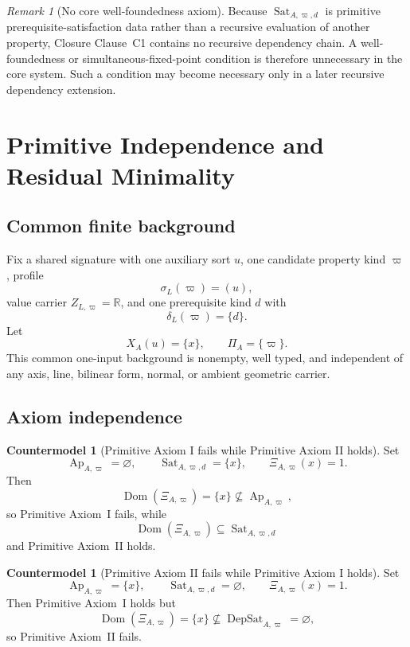 \documentclass[11pt]{article}
\newcommand{\Ap}{\operatorname{Ap}}
\newcommand{\DepSat}{\operatorname{DepSat}}
\newcommand{\Sat}{\operatorname{Sat}}
\newcommand{\Dom}{\operatorname{Dom}}
\theoremstyle{definition}
\newtheorem{countermodel}[theorem]{Countermodel}
\theoremstyle{remark}
\newtheorem{remark}[theorem]{Remark}
\begin{document}
\begin{remark}[No core well-foundedness axiom]
Because \(\Sat_{A,\varpi,d}\) is primitive prerequisite-satisfaction data rather than a recursive evaluation of another property, Closure Clause~C1 contains no recursive dependency chain.
A well-foundedness or simultaneous-fixed-point condition is therefore unnecessary in the core system.
Such a condition may become necessary only in a later recursive dependency extension.
\end{remark}

\section{Primitive Independence and Residual Minimality}
\label{sec:independence}

\subsection{Common finite background}

Fix a shared signature with one auxiliary sort \(u\), one candidate property kind \(\varpi\), profile
\[
\sigma_L(\varpi)=(u),
\]
value carrier \(Z_{L,\varpi}=\mathbb R\), and one prerequisite kind \(d\) with
\[
\delta_L(\varpi)=\{d\}.
\]
Let
\[
X_A(u)=\{x\},
\qquad
\Pi_A=\{\varpi\}.
\]
This common one-input background is nonempty, well typed, and independent of any axis, line, bilinear form, normal, or ambient geometric carrier.

\subsection{Axiom independence}

\begin{countermodel}[Primitive Axiom I fails while Primitive Axiom II holds]
\label{cm:pi}
Set
\[
\Ap_{A,\varpi}=\varnothing,
\qquad
\Sat_{A,\varpi,d}=\{x\},
\qquad
\Xi_{A,\varpi}(x)=1.
\]
Then
\[
\Dom(\Xi_{A,\varpi})=\{x\}\not\subseteq\Ap_{A,\varpi},
\]
so Primitive Axiom~I fails, while
\[
\Dom(\Xi_{A,\varpi})\subseteq\Sat_{A,\varpi,d}
\]
and Primitive Axiom~II holds.
\end{countermodel}

\begin{countermodel}[Primitive Axiom II fails while Primitive Axiom I holds]
\label{cm:pii}
Set
\[
\Ap_{A,\varpi}=\{x\},
\qquad
\Sat_{A,\varpi,d}=\varnothing,
\qquad
\Xi_{A,\varpi}(x)=1.
\]
Then Primitive Axiom~I holds but
\[
\Dom(\Xi_{A,\varpi})=\{x\}\not\subseteq\DepSat_{A,\varpi}=\varnothing,
\]
so Primitive Axiom~II fails.
\end{countermodel}
\end{document}
